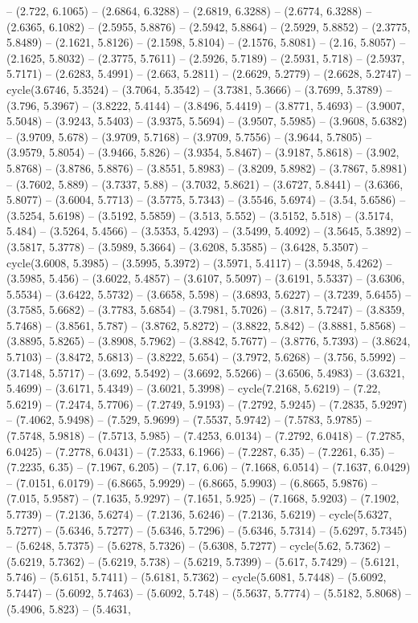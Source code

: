 -- (2.722, 6.1065) -- (2.6864, 6.3288) -- (2.6819, 6.3288) -- (2.6774, 6.3288) -- (2.6365, 6.1082) -- (2.5955, 5.8876) -- (2.5942, 5.8864) -- (2.5929, 5.8852) -- (2.3775, 5.8489) -- (2.1621, 5.8126) -- (2.1598, 5.8104) -- (2.1576, 5.8081) -- (2.16, 5.8057) -- (2.1625, 5.8032) -- (2.3775, 5.7611) -- (2.5926, 5.7189) -- (2.5931, 5.718) -- (2.5937, 5.7171) -- (2.6283, 5.4991) -- (2.663, 5.2811) -- (2.6629, 5.2779) -- (2.6628, 5.2747) -- cycle(3.6746, 5.3524) -- (3.7064, 5.3542) -- (3.7381, 5.3666) -- (3.7699, 5.3789) -- (3.796, 5.3967) -- (3.8222, 5.4144) -- (3.8496, 5.4419) -- (3.8771, 5.4693) -- (3.9007, 5.5048) -- (3.9243, 5.5403) -- (3.9375, 5.5694) -- (3.9507, 5.5985) -- (3.9608, 5.6382) -- (3.9709, 5.678) -- (3.9709, 5.7168) -- (3.9709, 5.7556) -- (3.9644, 5.7805) -- (3.9579, 5.8054) -- (3.9466, 5.826) -- (3.9354, 5.8467) -- (3.9187, 5.8618) -- (3.902, 5.8768) -- (3.8786, 5.8876) -- (3.8551, 5.8983) -- (3.8209, 5.8982) -- (3.7867, 5.8981) -- (3.7602, 5.889) -- (3.7337, 5.88) -- (3.7032, 5.8621) -- (3.6727, 5.8441) -- (3.6366, 5.8077) -- (3.6004, 5.7713) -- (3.5775, 5.7343) -- (3.5546, 5.6974) -- (3.54, 5.6586) -- (3.5254, 5.6198) -- (3.5192, 5.5859) -- (3.513, 5.552) -- (3.5152, 5.518) -- (3.5174, 5.484) -- (3.5264, 5.4566) -- (3.5353, 5.4293) -- (3.5499, 5.4092) -- (3.5645, 5.3892) -- (3.5817, 5.3778) -- (3.5989, 5.3664) -- (3.6208, 5.3585) -- (3.6428, 5.3507) -- cycle(3.6008, 5.3985) -- (3.5995, 5.3972) -- (3.5971, 5.4117) -- (3.5948, 5.4262) -- (3.5985, 5.456) -- (3.6022, 5.4857) -- (3.6107, 5.5097) -- (3.6191, 5.5337) -- (3.6306, 5.5534) -- (3.6422, 5.5732) -- (3.6658, 5.598) -- (3.6893, 5.6227) -- (3.7239, 5.6455) -- (3.7585, 5.6682) -- (3.7783, 5.6854) -- (3.7981, 5.7026) -- (3.817, 5.7247) -- (3.8359, 5.7468) -- (3.8561, 5.787) -- (3.8762, 5.8272) -- (3.8822, 5.842) -- (3.8881, 5.8568) -- (3.8895, 5.8265) -- (3.8908, 5.7962) -- (3.8842, 5.7677) -- (3.8776, 5.7393) -- (3.8624, 5.7103) -- (3.8472, 5.6813) -- (3.8222, 5.654) -- (3.7972, 5.6268) -- (3.756, 5.5992) -- (3.7148, 5.5717) -- (3.692, 5.5492) -- (3.6692, 5.5266) -- (3.6506, 5.4983) -- (3.6321, 5.4699) -- (3.6171, 5.4349) -- (3.6021, 5.3998) -- cycle(7.2168, 5.6219) -- (7.22, 5.6219) -- (7.2474, 5.7706) -- (7.2749, 5.9193) -- (7.2792, 5.9245) -- (7.2835, 5.9297) -- (7.4062, 5.9498) -- (7.529, 5.9699) -- (7.5537, 5.9742) -- (7.5783, 5.9785) -- (7.5748, 5.9818) -- (7.5713, 5.985) -- (7.4253, 6.0134) -- (7.2792, 6.0418) -- (7.2785, 6.0425) -- (7.2778, 6.0431) -- (7.2533, 6.1966) -- (7.2287, 6.35) -- (7.2261, 6.35) -- (7.2235, 6.35) -- (7.1967, 6.205) -- (7.17, 6.06) -- (7.1668, 6.0514) -- (7.1637, 6.0429) -- (7.0151, 6.0179) -- (6.8665, 5.9929) -- (6.8665, 5.9903) -- (6.8665, 5.9876) -- (7.015, 5.9587) -- (7.1635, 5.9297) -- (7.1651, 5.925) -- (7.1668, 5.9203) -- (7.1902, 5.7739) -- (7.2136, 5.6274) -- (7.2136, 5.6246) -- (7.2136, 5.6219) -- cycle(5.6327, 5.7277) -- (5.6346, 5.7277) -- (5.6346, 5.7296) -- (5.6346, 5.7314) -- (5.6297, 5.7345) -- (5.6248, 5.7375) -- (5.6278, 5.7326) -- (5.6308, 5.7277) -- cycle(5.62, 5.7362) -- (5.6219, 5.7362) -- (5.6219, 5.738) -- (5.6219, 5.7399) -- (5.617, 5.7429) -- (5.6121, 5.746) -- (5.6151, 5.7411) -- (5.6181, 5.7362) -- cycle(5.6081, 5.7448) -- (5.6092, 5.7447) -- (5.6092, 5.7463) -- (5.6092, 5.748) -- (5.5637, 5.7774) -- (5.5182, 5.8068) -- (5.4906, 5.823) -- (5.4631, 